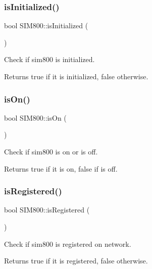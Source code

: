 \subsubsection{\texorpdfstring{is\+Initialized()}{isInitialized()}}
{\footnotesize\ttfamily bool S\+I\+M800\+::is\+Initialized (\begin{DoxyParamCaption}{ }\end{DoxyParamCaption})}



Check if sim800 is initialized. 

\begin{DoxyReturn}{Returns}
true if it is initialized, false otherwise. 
\end{DoxyReturn}
\mbox{\label{classSIM800_aa021c75801b1918b5ad0fa56069f375c}} 
\subsubsection{\texorpdfstring{is\+On()}{isOn()}}
{\footnotesize\ttfamily bool S\+I\+M800\+::is\+On (\begin{DoxyParamCaption}{ }\end{DoxyParamCaption})}



Check if sim800 is on or is off. 

\begin{DoxyReturn}{Returns}
true if it is on, false if is off. 
\end{DoxyReturn}
\mbox{\label{classSIM800_a275fc00e4d607e244c3ce9f6eff032d2}} 
\subsubsection{\texorpdfstring{is\+Registered()}{isRegistered()}}
{\footnotesize\ttfamily bool S\+I\+M800\+::is\+Registered (\begin{DoxyParamCaption}{ }\end{DoxyParamCaption})}



Check if sim800 is registered on network. 

\begin{DoxyReturn}{Returns}
true if it is registered, false otherwise. 
\end{DoxyReturn}
\mbox{\label{classSIM800_a373c14a3362d291f32c8019f072dfe4e}} 
